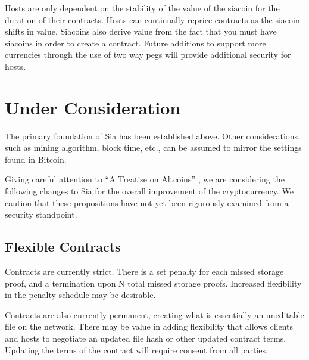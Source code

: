 \documentclass[twocolumn]{article}
\begin{document}
Hosts are only dependent on the stability of the value of the siacoin for the duration of their contracts.
Hosts can continually reprice contracts as the siacoin shifts in value.
Siacoins also derive value from the fact that you must have siacoins in order to create a contract.
Future additions to support more currencies through the use of two way pegs will provide additional security for hosts.

\section{Under Consideration}
The primary foundation of Sia has been established above.
Other considerations, such as mining algorithm, block time, etc., can be assumed to mirror the settings found in Bitcoin.

Giving careful attention to ``A Treatise on Altcoins'' \cite{alts}, we are considering the following changes to Sia for the overall improvement of the cryptocurrency.
We caution that these propositions have not yet been rigorously examined from a security standpoint.

\subsection{Flexible Contracts}
Contracts are currently strict.
There is a set penalty for each missed storage proof, and a termination upon N total missed storage proofs.
Increased flexibility in the penalty schedule may be desirable.

Contracts are also currently permanent, creating what is essentially an uneditable file on the network.
There may be value in adding flexibility that allows clients and hosts to negotiate an updated file hash or other updated contract terms.
Updating the terms of the contract will require consent from all parties.


\end{document}
